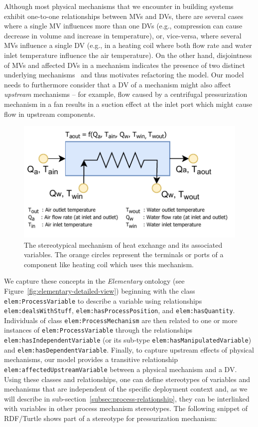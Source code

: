 \documentclass[sigconf]{acmart}
\begin{document}
Although most physical mechanisms that we encounter in building systems exhibit one-to-one relationships between MVs and DVs, there are several cases where a single MV influences more than one DVs (e.g., compression can cause decrease in volume and increase in temperature), or, vice-versa, where several MVs influence a single DV (e.g., in a heating coil where both flow rate and water inlet temperature influence the air temperature).
On the other hand, disjointness of MVs and affected DVs in a mechanism indicates the presence of two distinct underlying mechanisms~\cite{top1991computational} and thus motivates refactoring the model.
%
Our model needs to furthermore consider that a DV of a mechanism might also affect \emph{upstream} mechanisms -- for example, flow caused by a centrifugal pressurization mechanism in a fan results in a suction effect at the inlet port which might cause flow in upstream components.

\begin{figure}[t]
\centering
\includegraphics[width=0.9\linewidth]{figures/a_mpm_process_variables.pdf}
\caption{The stereotypical mechanism of heat exchange and its associated variables. The orange circles represent the terminals or ports of a component like heating coil which uses this mechanism.}
\label{fig:process-variables}
\end{figure}

We capture these concepts in the \emph{Elementary} ontology (see Figure~\ref{fig:elementary-detailed-view}) beginning with the class \texttt{elem:Process\-Variable} to describe a variable using relationships \texttt{elem:deals\-With\-Stuff}, \texttt{elem:has\-Pro\-cess\-Po\-si\-tion}, and \texttt{elem:has\-Quantity}.
Individuals of class \texttt{elem:Process\-Mech\-ani\-sm} are then related to one or more instances of \texttt{elem:Process\-Variable} through the relationships \texttt{elem:has\-In\-de\-pen\-dent\-Variable} (or its sub-type \texttt{elem:has\-Ma\-ni\-pu\-la\-tedVa\-ri\-a\-ble}) and \texttt{elem:has\-De\-pen\-dent\-Va\-ri\-a\-ble}.
Finally, to capture upstream effects of physical mechanisms, our model provides a transitive relationship \texttt{elem:aff\-ect\-ed\-Up\-str\-eam\-Var\-ia\-ble} between a physical mechanism and a DV.
%
Using these classes and relationships, one can define stereotypes of variables and mechanisms that are independent of the specific deployment context and, as we will describe in sub-section~\ref{subsec:process-relationship}, they can be interlinked with variables in other process mechanism stereotypes.
The following snippet of RDF/Turtle shows part of a stereotype for pressurization mechanism:
\end{document}
